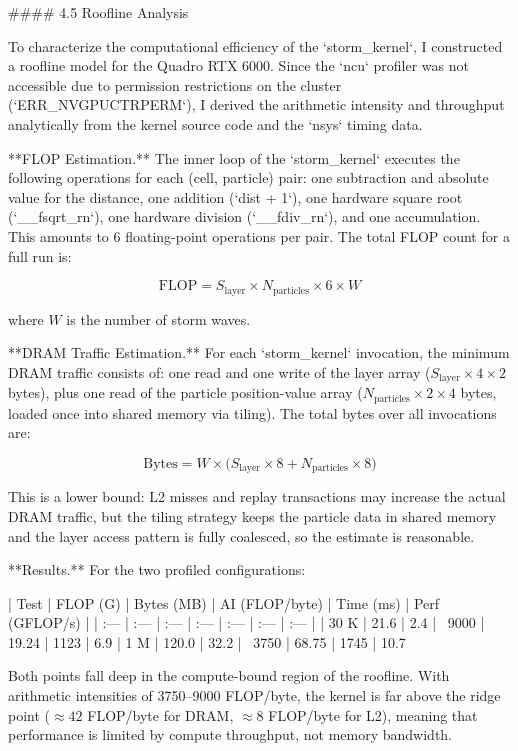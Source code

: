 \documentclass[10pt,dvipsnames,table,twocolumn]{article}
\begin{document}
#### 4.5 Roofline Analysis

To characterize the computational efficiency of the `storm_kernel`, I constructed a roofline model for the Quadro RTX 6000. Since the `ncu` profiler was not accessible due to permission restrictions on the cluster (`ERR_NVGPUCTRPERM`), I derived the arithmetic intensity and throughput analytically from the kernel source code and the `nsys` timing data.

**FLOP Estimation.**
The inner loop of the `storm_kernel` executes the following operations for each (cell, particle) pair: one subtraction and absolute value for the distance, one addition (`dist + 1`), one hardware square root (`__fsqrt_rn`), one hardware division (`__fdiv_rn`), and one accumulation. This amounts to 6 floating-point operations per pair. The total FLOP count for a full run is:

$$\text{FLOP} = S_{\text{layer}} \times N_{\text{particles}} \times 6 \times W$$

where $W$ is the number of storm waves.

**DRAM Traffic Estimation.**
For each `storm_kernel` invocation, the minimum DRAM traffic consists of: one read and one write of the layer array ($S_{\text{layer}} \times 4 \times 2$ bytes), plus one read of the particle position-value array ($N_{\text{particles}} \times 2 \times 4$ bytes, loaded once into shared memory via tiling). The total bytes over all invocations are:

$$\text{Bytes} = W \times \big( S_{\text{layer}} \times 8 + N_{\text{particles}} \times 8 \big)$$

This is a lower bound: L2 misses and replay transactions may increase the actual DRAM traffic, but the tiling strategy keeps the particle data in shared memory and the layer access pattern is fully coalesced, so the estimate is reasonable.

**Results.**
For the two profiled configurations:

| Test | FLOP (G) | Bytes (MB) | AI (FLOP/byte) | Time (ms) | Perf (GFLOP/s) | %
| :--- | :--- | :--- | :--- | :--- | :--- | :--- |
| 30 K | 21.6 | 2.4 | ~9000 | 19.24 | 1123 | 6.9%
| 1 M | 120.0 | 32.2 | ~3750 | 68.75 | 1745 | 10.7%

Both points fall deep in the compute-bound region of the roofline. With arithmetic intensities of 3750–9000 FLOP/byte, the kernel is far above the ridge point ($\approx 42$ FLOP/byte for DRAM, $\approx 8$ FLOP/byte for L2), meaning that performance is limited by compute throughput, not memory bandwidth.
\end{document}
